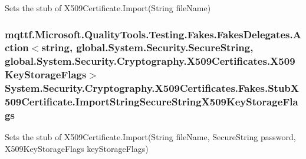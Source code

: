 Sets the stub of X509\-Certificate.\-Import(\-String file\-Name)

\hypertarget{class_system_1_1_security_1_1_cryptography_1_1_x509_certificates_1_1_fakes_1_1_stub_x509_certificate_a31f005d0ddc52edb413877f147101d3a}{
\subsubsection[{Import\-String\-Secure\-String\-X509\-Key\-Storage\-Flags}]{\setlength{\rightskip}{0pt plus 5cm}mqttf.\-Microsoft.\-Quality\-Tools.\-Testing.\-Fakes.\-Fakes\-Delegates.\-Action$<$string, global.\-System.\-Security.\-Secure\-String, global.\-System.\-Security.\-Cryptography.\-X509\-Certificates.\-X509\-Key\-Storage\-Flags$>$ System.\-Security.\-Cryptography.\-X509\-Certificates.\-Fakes.\-Stub\-X509\-Certificate.\-Import\-String\-Secure\-String\-X509\-Key\-Storage\-Flags}}\label{class_system_1_1_security_1_1_cryptography_1_1_x509_certificates_1_1_fakes_1_1_stub_x509_certificate_a31f005d0ddc52edb413877f147101d3a}


Sets the stub of X509\-Certificate.\-Import(\-String file\-Name, Secure\-String password, X509\-Key\-Storage\-Flags key\-Storage\-Flags)

